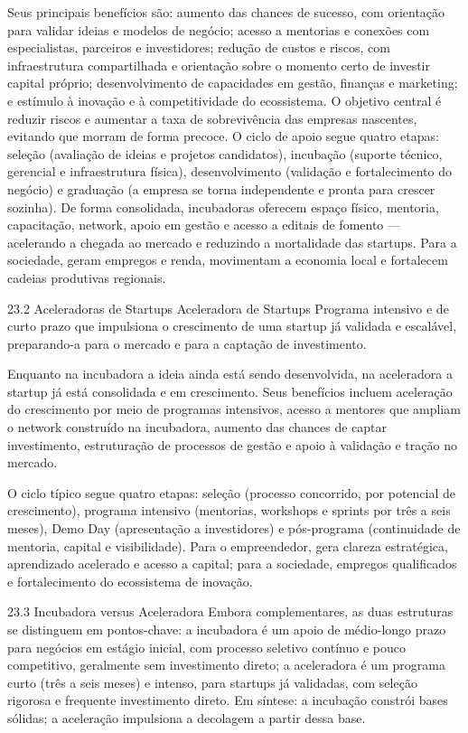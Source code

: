 Seus principais benefícios são: aumento das chances de sucesso, com orientação para validar ideias e modelos de negócio; acesso a mentorias e conexões com especialistas, parceiros e investidores; redução de custos e riscos, com infraestrutura compartilhada e orientação sobre o momento certo de investir capital próprio; desenvolvimento de capacidades em gestão, finanças e marketing; e estímulo à inovação e à competitividade do ecossistema. O objetivo central é reduzir riscos e aumentar a taxa de sobrevivência das empresas nascentes, evitando que morram de forma precoce. O ciclo de apoio segue quatro etapas: seleção (avaliação de ideias e projetos candidatos), incubação (suporte técnico, gerencial e infraestrutura física), desenvolvimento (validação e fortalecimento do negócio) e graduação (a empresa se torna independente e pronta para crescer sozinha). De forma consolidada, incubadoras oferecem espaço físico, mentoria, capacitação, network, apoio em gestão e acesso a editais de fomento — acelerando a chegada ao mercado e reduzindo a mortalidade das startups. Para a sociedade, geram empregos e renda, movimentam a economia local e fortalecem cadeias produtivas regionais.

23.2 Aceleradoras de Startups Aceleradora de Startups Programa intensivo e de curto prazo que impulsiona o crescimento de uma startup já validada e escalável, preparando-a para o mercado e para a captação de investimento.

Enquanto na incubadora a ideia ainda está sendo desenvolvida, na aceleradora a startup já está consolidada e em crescimento. Seus benefícios incluem aceleração do crescimento por meio de programas intensivos, acesso a mentores que ampliam o network construído na incubadora, aumento das chances de captar investimento, estruturação de processos de gestão e apoio à validação e tração no mercado.

O ciclo típico segue quatro etapas: seleção (processo concorrido, por potencial de crescimento), programa intensivo (mentorias, workshops e sprints por três a seis meses), Demo Day (apresentação a investidores) e pós-programa (continuidade de mentoria, capital e visibilidade). Para o empreendedor, gera clareza estratégica, aprendizado acelerado e acesso a capital; para a sociedade, empregos qualificados e fortalecimento do ecossistema de inovação.

23.3 Incubadora versus Aceleradora Embora complementares, as duas estruturas se distinguem em pontos-chave: a incubadora é um apoio de médio-longo prazo para negócios em estágio inicial, com processo seletivo contínuo e pouco competitivo, geralmente sem investimento direto; a aceleradora é um programa curto (três a seis meses) e intenso, para startups já validadas, com seleção rigorosa e frequente investimento direto. Em síntese: a incubação constrói bases sólidas; a aceleração impulsiona a decolagem a partir dessa base.

